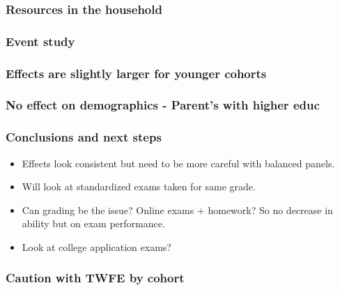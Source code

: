 \documentclass{beamer}
\begin{document}
\begin{frame}
    \label{raw}
    \frametitle{Resources in the household}
        {
  }  
\end{frame}



\begin{frame}
    \label{raw}
    \frametitle{Event study}
        {
  }  
\end{frame}




\begin{frame}
    \label{event_cohort_m}
    \frametitle{Effects are slightly larger for younger cohorts}
        {
  }  
\end{frame}

\begin{frame}
    \label{event_cohort_m}
    \frametitle{No effect on demographics - Parent's with higher educ}
        {
  }  
\end{frame}



\begin{frame}
    \frametitle{Conclusions and next steps}
    \begin{itemize}
        \item Effects look consistent but need to be more careful with balanced panels.
        \item Will look at standardized exams taken for same grade.
        \item Can grading be the issue? Online exams + homework? So no decrease in ability but on exam performance.
        \item Look at college application exams?
    \end{itemize}
\end{frame}

\begin{frame}
    \label{event_cohort_m}
    \frametitle{Caution with TWFE by cohort}
        {
  }  
\end{frame}
\end{document}

